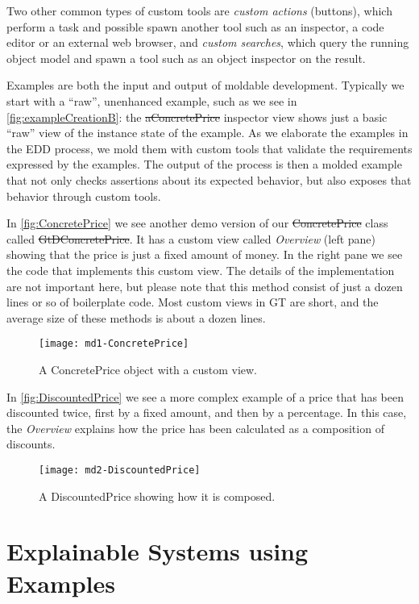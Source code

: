 \documentclass[sigplan,anonymous,review,10pt]{acmart}
\begin{document}
Two other common types of custom tools are \emph{custom actions} (\eg buttons), which perform a task and possible spawn another tool such as an inspector, a code editor or an external web browser, and \emph{custom searches}, which query the running object model and spawn a tool such as an object inspector on the result.

Examples are both the input and output of moldable development.
Typically we start with a ``raw'', unenhanced example, such as we see in \autoref{fig:exampleCreationB}: the \st{aConcretePrice} inspector view shows just a basic ``raw'' view of the instance state of the example.
As we elaborate the examples in the EDD process, we mold them with custom tools that validate the requirements expressed by the examples.
The output of the process is then a molded example that not only checks assertions about its expected behavior, but also exposes that behavior through custom tools.

In \autoref{fig:ConcretePrice} we see another demo version of our \st{ConcretePrice} class called \st{GtDConcretePrice}.
It has a custom view called \emph{Overview} (left pane) showing that the price is just a fixed amount of money.
In the right pane we see the code that implements this custom view.
The details of the implementation are not important here, but please note that this method consist of just a dozen lines or so of boilerplate code.
Most custom views in GT are short, and the average size of these methods is about a dozen lines.

\begin{figure}[h]
  \texttt{[image: md1-ConcretePrice]}
  \caption{A ConcretePrice object with a custom view.}
  \label{fig:ConcretePrice}
\end{figure}

In \autoref{fig:DiscountedPrice} we see a more complex example of a price that has been discounted twice, first by a fixed amount, and then by a percentage.
In this case, the \emph{Overview} explains how the price has been calculated as a composition of discounts.

\begin{figure}[h]
  \texttt{[image: md2-DiscountedPrice]}
  \caption{A DiscountedPrice showing how it is composed.}
  \label{fig:DiscountedPrice}
\end{figure}

\section{Explainable Systems using Examples}\label{sec:explainable}
\end{document}
